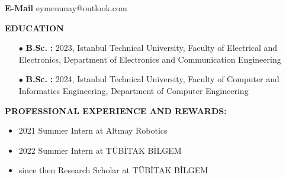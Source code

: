 \textbf{E-Mail\makebox[3.685cm]{\hfill \textbf{:}}}\hspace{0.225em} eymenunay@outlook.com \\ %

\vspace{5mm}

\renewcommand\labelitemi{\normalsize$\bullet$} 			%

\textbf{EDUCATION\makebox[2.41cm]{\hfill \textbf{:}}}  	%
\vspace{-3mm}

\begin{itemize}[leftmargin=5.15cm,itemsep=-0.25em,labelsep=2mm] %
	\item [$\bullet$ \hspace{1em}\textbf{B.Sc.} \hspace{6.85em} \textbf{:}] 2023, Istanbul Technical University, Faculty of Electrical and Electronics, Department of Electronics and Communication Engineering
	\item [$\bullet$ \hspace{1em}\textbf{B.Sc.} \hspace{6.85em} \textbf{:}] 2024, Istanbul Technical University, Faculty of Computer and Informatics Engineering, Department of Computer Engineering
\end{itemize}

\textbf{PROFESSIONAL EXPERIENCE AND REWARDS:}   
\vspace{-3mm}
\begin{itemize}[leftmargin=0.7cm,itemsep=-0.25em,labelsep=5mm] %
	\item 2021 Summer Intern at Altınay Robotics
	\item 2022 Summer Intern at TÜBİTAK BİLGEM
	\item since then Research Scholar at TÜBİTAK BİLGEM
\end{itemize}





